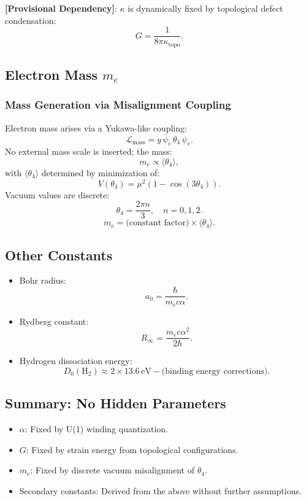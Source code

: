 \documentclass[12pt]{article}
\begin{document}
\textbf{[Provisional Dependency]}: \( \kappa \) is dynamically fixed by topological defect condensation:
\[
\boxed{G = \frac{1}{8\pi \kappa_{\text{topo}}}}.
\]

\subsection{Electron Mass \( m_e \)}

\subsubsection{Mass Generation via Misalignment Coupling}

Electron mass arises via a Yukawa-like coupling:
\[
\mathcal{L}_{\text{mass}} = y \, \bar{\psi}_e \, \theta_4 \, \psi_e.
\]
No external mass scale is inserted; the mass:
\[
m_e \propto \langle \theta_4 \rangle,
\]
with \( \langle \theta_4 \rangle \) determined by minimization of:
\[
V(\theta_4) = \mu^2 \left( 1 - \cos(3 \theta_4) \right).
\]
Vacuum values are discrete:
\[
\theta_4 = \frac{2\pi n}{3}, \quad n = 0, 1, 2.
\]
\[
\boxed{m_e = \text{(constant factor)} \times \langle \theta_4 \rangle}.
\]

\subsection{Other Constants}

\begin{itemize}
    \item Bohr radius:
    \[
    a_0 = \frac{\hbar}{m_e c \alpha}.
    \]
    \item Rydberg constant:
    \[
    R_\infty = \frac{m_e c \alpha^2}{2 \hbar}.
    \]
    \item Hydrogen dissociation energy:
    \[
    D_0(\text{H}_2) \approx 2 \times 13.6 \, \text{eV} - \text{(binding energy corrections)}.
    \]
\end{itemize}

\subsection{Summary: No Hidden Parameters}

\begin{itemize}
    \item \( \alpha \): Fixed by U(1) winding quantization.
    \item \( G \): Fixed by strain energy from topological configurations.
    \item \( m_e \): Fixed by discrete vacuum misalignment of \( \theta_4 \).
    \item Secondary constants: Derived from the above without further assumptions.
\end{itemize}
\end{document}
